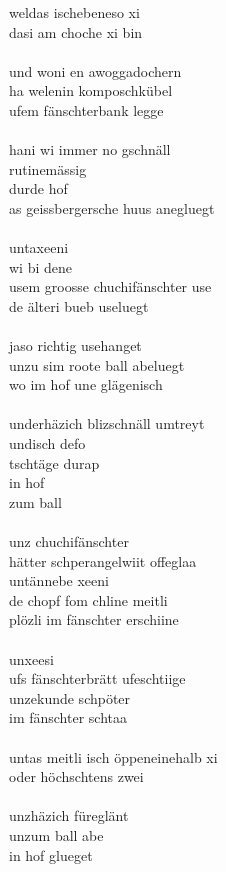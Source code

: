 \documentclass[a4paper,11pt]{scrartcl}
\begin{document}
\begin{multicols}{2}
\noindent
weldas ischebeneso xi\\
dasi am choche xi bin\\
\\
und woni en awoggadochern\\
ha welenin komposchkübel\\
ufem fänschterbank legge\\
\\
hani wi immer no gschnäll\\
rutinemässig\\
durde hof\\
as geissbergersche huus anegluegt\\
\\
untaxeeni\\
wi bi dene\\
usem groosse chuchifänschter use\\
de älteri bueb useluegt\\
\\
jaso richtig usehanget\\
unzu sim roote ball abeluegt\\
wo im hof une glägenisch\\
\\
underhäzich blizschnäll umtreyt\\
undisch defo\\
tschtäge durap\\
in hof\\
zum ball\\
\\
unz chuchifänschter\\
hätter schperangelwiit offeglaa\\
untännebe xeeni\\
de chopf fom chline meitli\\
plözli im fänschter erschiine\\
\\
unxeesi\\
ufs fänschterbrätt ufeschtiige\\
unzekunde schpöter\\
im fänschter schtaa\\
\\
untas meitli isch öppeneinehalb xi\\
oder höchschtens zwei\\
\\
unzhäzich füreglänt\\
unzum ball abe\\
in hof glueget
\end{multicols}
\end{document}
